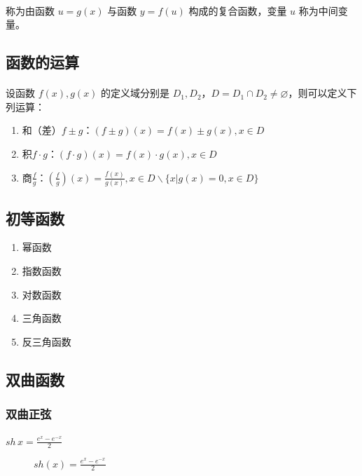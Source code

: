 \paragraph{}
称为由函数 $u = g(x)$ 与函数 $y = f(u)$ 构成的复合函数，变量 $u$ 称为中间变量。

\subsection{函数的运算}
\paragraph{}
设函数 $f(x), g(x)$ 的定义域分别是 $D_1, D_2$，$D = D_1 \cap D_2 \neq \varnothing$，则可以定义下列运算：

\begin{enumerate}
  \item 和（差）$f \pm g$：$(f \pm g)(x) = f(x) \pm g(x), x \in D$
  \item 积$f \cdot g$：$(f \cdot g)(x) = f(x) \cdot g(x), x \in D$
  \item 商$\frac{f}{g}$：$(\frac{f}{g})(x) = \frac{f(x)}{g(x)}, x \in D  \backslash \{x|g(x) = 0, x \in D\}$
\end{enumerate}

\subsection{初等函数}

\begin{enumerate}
  \item 幂函数
  \item 指数函数
  \item 对数函数
  \item 三角函数
  \item 反三角函数
\end{enumerate}

\subsection{双曲函数}
\subsubsection{双曲正弦}
\paragraph{}
$sh \, x = \frac{e^x - e^{-x}}{2}$

\begin{figure}[H]
  \centering
    
    \caption{$sh(x) = \frac{e^x - e^{-x}}{2}$}
    \label{sh_x}
\end{figure}

